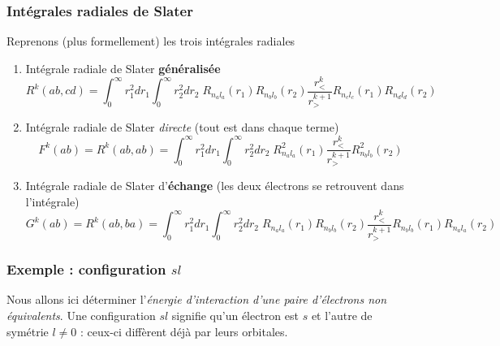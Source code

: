 \subsubsection{Intégrales radiales de Slater}
Reprenons (plus formellement) les trois intégrales radiales
\begin{enumerate}
\item Intégrale radiale de Slater \textbf{généralisée}
\begin{equation}
R^k (ab, cd) = \int_0^{\infty} r_1^2 dr_1 \int_0^{\infty} r_2^2 dr_2  \; 
R_{n_a l_a} (r_1 ) R_{n_b l_b} (r_2 ) \frac{r_<^k}{r_>^{k+1}} R_{n_c l_c} (r_1 ) R_{n_d l_d} (r_2 )
\end{equation}
\item Intégrale radiale de Slater \textit{directe} (tout est dans chaque terme)
\begin{equation}
F^k (ab) = 
R^k (ab, ab) = 
\int_0^{\infty} r_1^2 dr_1 \int_0^{\infty} r_2^2 dr_2  \; 
R^2_{n_a l_a} (r_1 )  \frac{r_<^k}{r_>^{k+1}} 
R^2_{n_b l_b} (r_2 )
\end{equation}
\item Intégrale radiale de Slater d'\textbf{échange} (les deux électrons se retrouvent dans 
l'intégrale)
\begin{equation}
G^k (ab) = R^k (ab, ba) = 
\int_0^{\infty} r_1^2 dr_1 \int_0^{\infty} r_2^2 dr_2  \; 
R_{n_a l_a} (r_1 ) R_{n_b l_b} (r_2 )   
\frac{r_<^k}{r_>^{k+1}} 
R_{n_b l_b} (r_1 ) R_{n_a l_a} (r_2 )
\end{equation}
\end{enumerate}


\subsubsection{Exemple : configuration $sl$}
Nous allons ici déterminer l'\textit{énergie d'interaction d'une paire d'électrons non équivalents}.
Une configuration $sl$ signifie qu'un électron est $s$ et l'autre de symétrie $l\neq0$ : ceux-ci 
diffèrent déjà par leurs orbitales.\\

